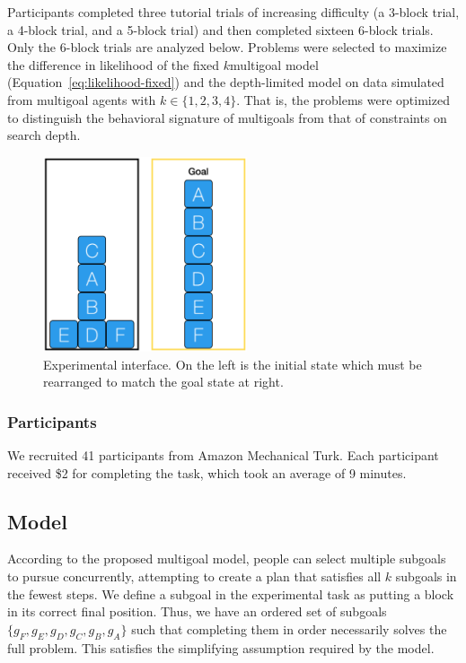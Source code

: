 \documentclass[10pt,letterpaper]{article}
\newcommand{\red}[1]{\textcolor{red}{#1}}
\begin{document}
Participants completed three tutorial trials of increasing difficulty (a 3-block trial, a 4-block trial, and a 5-block trial) and then completed sixteen 6-block trials. Only the 6-block trials are analyzed below. Problems were selected to maximize the difference in likelihood of the fixed $k$multigoal model (Equation~\ref{eq:likelihood-fixed}) and the depth-limited model on data simulated from multigoal agents with $k \in \{ 1,2,3,4 \}$. That is, the problems were optimized to distinguish the behavioral signature of multigoals from that of constraints on search depth.

\begin{figure}[ht]
    \centering
    \includegraphics[width=6cm]{example-block-world.png}
    \caption{Experimental interface. On the left is the initial state which must be rearranged to match the goal state at right.}
    \label{fig:ui}
\end{figure}

\subsubsection{Participants}
We recruited 41 participants from Amazon Mechanical Turk. Each participant received \$2 for completing the task, which took an average of 9 minutes.

\subsection{Model}
 
According to the proposed multigoal model, people can select multiple subgoals to pursue concurrently, attempting to create a plan that satisfies all $k$ subgoals in the fewest steps. We define a subgoal in the experimental task as putting a block in its correct final position. Thus, we have an ordered set of subgoals $\{ g_F, g_E, g_D, g_C, g_B, g_A \}$ such that completing them in order necessarily solves the full problem. This satisfies the simplifying assumption required by the model.
\end{document}
